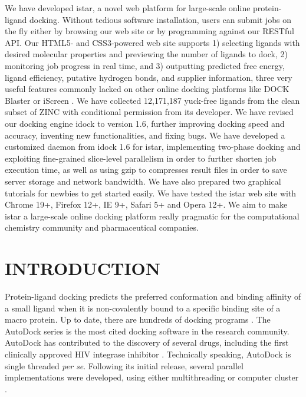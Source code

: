 \documentclass[12pt]{article}
\begin{document}
We have developed istar, a novel web platform for large-scale online protein-ligand docking. Without tedious software installation, users can submit jobs on the fly either by browsing our web site or by programming against our RESTful API. Our HTML5- and CSS3-powered web site supports 1) selecting ligands with desired molecular properties and previewing the number of ligands to dock, 2) monitoring job progress in real time, and 3) outputting predicted free energy, ligand efficiency, putative hydrogen bonds, and supplier information, three very useful features commonly lacked on other online docking platforms like DOCK Blaster \citep{557} or iScreen \citep{899}. We have collected 12,171,187 yuck-free ligands from the clean subset of ZINC \citep{532,1178} with conditional permission from its developer. We have revised our docking engine idock \citep{1153} to version 1.6, further improving docking speed and accuracy, inventing new functionalities, and fixing bugs. We have developed a customized daemon from idock 1.6 for istar, implementing two-phase docking and exploiting fine-grained slice-level parallelism in order to further shorten job execution time, as well as using gzip to compresses result files in order to save server storage and network bandwidth. We have also prepared two graphical tutorials for newbies to get started easily. We have tested the istar web site with Chrome 19+, Firefox 12+, IE 9+, Safari 5+ and Opera 12+. We aim to make istar a large-scale online docking platform really pragmatic for the computational chemistry community and pharmaceutical companies.

\section*{\sffamily \Large INTRODUCTION} %

Protein-ligand docking predicts the preferred conformation and binding affinity of a small ligand when it is non-covalently bound to a specific binding site of a macro protein. Up to date, there are hundreds of docking programs \citep{493,922}. The AutoDock series is the most cited docking software in the research community. AutoDock has contributed to the discovery of several drugs, including the first clinically approved HIV integrase inhibitor \citep{1169}. Technically speaking, AutoDock is single threaded \textit{per se}. Following its initial release, several parallel implementations were developed, using either multithreading or computer cluster \citep{115,560,782}.
\end{document}
